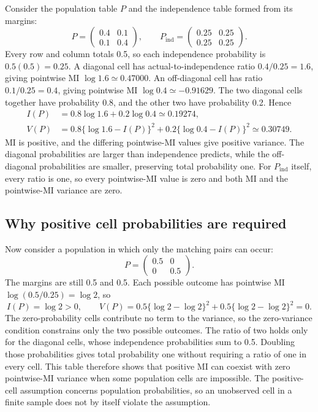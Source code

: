 Consider the population table \(P\) and the independence table formed
from its margins:
\begin{equation}
 P=\begin{pmatrix}0.4&0.1\\0.1&0.4\end{pmatrix},
 \qquad
 P_{\mathrm{ind}}=\begin{pmatrix}0.25&0.25\\0.25&0.25\end{pmatrix}.
\end{equation}
Every row and column totals 0.5, so each independence probability is
\(0.5(0.5)=0.25\). A diagonal cell has actual-to-independence ratio
\(0.4/0.25=1.6\), giving pointwise MI \(\log1.6\simeq0.47000\).
An off-diagonal cell has ratio \(0.1/0.25=0.4\), giving pointwise MI
\(\log0.4\simeq-0.91629\). The two diagonal cells together have
probability 0.8, and the other two have probability 0.2. Hence
\begin{align}
 I(P)&=0.8\log1.6+0.2\log0.4\simeq0.19274,\\
 V(P)&=0.8\{\log1.6-I(P)\}^2
       +0.2\{\log0.4-I(P)\}^2\simeq0.30749.
\end{align}
MI is positive, and the differing pointwise-MI values give positive
variance. The diagonal probabilities are larger than independence
predicts, while the off-diagonal probabilities are smaller, preserving
total probability one. For \(P_{\mathrm{ind}}\) itself, every ratio
is one, so every pointwise-MI value is zero and both MI and the
pointwise-MI variance are zero.

\subsection{Why positive cell probabilities are required}

Now consider a population in which only the matching pairs can occur:
\begin{equation}
 P=\begin{pmatrix}0.5&0\\0&0.5\end{pmatrix}.
\end{equation}
The margins are still 0.5 and 0.5. Each possible outcome has pointwise
MI \(\log(0.5/0.25)=\log2\), so
\begin{equation}
 I(P)=\log2>0,
 \qquad
 V(P)=0.5\{\log2-\log2\}^2
      +0.5\{\log2-\log2\}^2=0.
\end{equation}
The zero-probability cells contribute no term to the variance, so the
zero-variance condition constrains only the two possible outcomes. The
ratio of two holds only for the diagonal cells, whose independence probabilities sum
to 0.5. Doubling those probabilities gives total probability one without
requiring a ratio of one in every cell. This table therefore shows that
positive MI can coexist with zero pointwise-MI variance when some
population cells are impossible. The positive-cell assumption concerns
population probabilities, so an unobserved cell in a finite sample does
not by itself violate the assumption.
